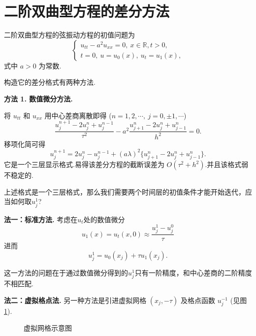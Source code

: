 \section{二阶双曲型方程的差分方法}

二阶双曲型方程的弦振动方程的初值问题为
\begin{equation} \label{eq:wave-equation}
    \begin{cases}
        u_{tt} - a^2 u_{xx} = 0, \ x \in \mathbb{R}, t > 0, \\
        t=0, \ u = u_0(x), \ u_t = u_1(x),
    \end{cases}
\end{equation}
式中 $a > 0$ 为常数.

构造它的差分格式有两种方法.

\noindent\textbf{方法 1. 数值微分方法.}

将 $u_{tt}$ 和 $u_{xx}$ 用中心差商离散即得 ($n=1, 2, \cdots, \ j=0, \pm 1, \cdots$)
\begin{equation} \label{eq:wave-finite-difference}
    \frac{u_j^{n+1} - 2u_j^n + u_j^{n-1}}{\tau^2} - a^2 \frac{u_{j+1}^n - 2u_j^n + u_{j-1}^n}{h^2} = 0.
\end{equation}
移项化简可得
\begin{equation*}
    u_j^{n+1}=2u_j^n - u_j^{n-1} + (a\lambda)^2 \{u_{j+1}^n - 2u_j^n + u_{j-1}^n\}.
\end{equation*}
它是一个三层显示格式.易得该差分方程的截断误差为 $O(\tau^2 + h^2)$.并且该格式弱不稳定的.\par
\begin{question}
    上述格式是一个三层格式，那么我们需要两个时间层的初值条件才能开始迭代，应当如何取$u_j^1$?
\end{question}
\noindent\textbf{法一：标准方法.} 考虑在$u_t$处的数值微分
\begin{equation*}
    u_1(x)=u_t(x,0)\approx \frac{u_j^1-u_j^0}{\tau}
\end{equation*}
进而
\begin{equation*}
    u_j^1 = u_0(x_j) + \tau u_1(x_j).
\end{equation*}

这一方法的问题在于通过数值微分得到的$u_j^1$只有一阶精度，和中心差商的二阶精度不相匹配.\par
\noindent\textbf{法二：虚拟格点法.} 另一种方法是引进虚拟网格 $(x_j, -\tau)$ 及格点函数 $u_j^{-1}$ (见图 \ref{fig:virtual-grid}).\par
\begin{figure}[htbp]
    \centering
    \caption{虚拟网格示意图}
    \label{fig:virtual-grid}
\end{figure}


